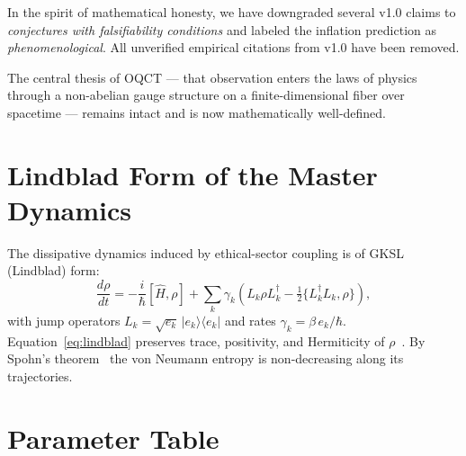 \documentclass[11pt,a4paper]{article}
\theoremstyle{myrmk}
\newcommand{\ket}[1]{|#1\rangle}
\newcommand{\bra}[1]{\langle#1|}
\begin{document}
In the spirit of mathematical honesty, we have downgraded several v1.0 claims to
\emph{conjectures with falsifiability conditions} and labeled the inflation prediction
as \emph{phenomenological}. All unverified empirical citations from v1.0 have been
removed.

The central thesis of OQCT --- that observation enters the laws of physics through a
non-abelian gauge structure on a finite-dimensional fiber over spacetime --- remains
intact and is now mathematically well-defined.

\appendix
\section{Lindblad Form of the Master Dynamics}
\label{sec:appendix-lindblad}

The dissipative dynamics induced by ethical-sector coupling is of GKSL (Lindblad) form:
\begin{equation}
  \frac{d\rho}{dt} = -\frac{i}{\hbar}[\hat H,\rho]
   + \sum_k\gamma_k\!\left(L_k\rho L_k^\dagger
     -\tfrac{1}{2}\{L_k^\dagger L_k,\rho\}\right),
  \label{eq:lindblad}
\end{equation}
with jump operators $L_k=\sqrt{e_k}\,\ket{e_k}\bra{e_k}$ and rates $\gamma_k=\beta\,e_k/\hbar$.
Equation~\eqref{eq:lindblad} preserves trace, positivity, and Hermiticity of
$\rho$~\cite{Lindblad1976,GKS1976}. By Spohn's theorem~\cite{Spohn1978} the von Neumann
entropy is non-decreasing along its trajectories.

\section{Parameter Table}
\label{sec:appendix-params}
\end{document}
